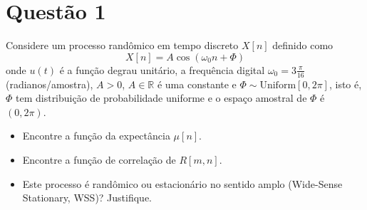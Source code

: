 \section{Questão 1}

Considere um processo randômico em tempo discreto $X[n]$ definido como
%
$$
    X[n] = A\cos(\omega_0 n + \Phi)
$$
%
onde $u(t)$ é a função degrau unitário,
a frequência digital $\omega_0 = 3\frac{\pi}{16}$ (radianos/amostra),
$A>0$, $A\in\mathbb{R}$ é uma constante e 
$\Phi \sim \text{Uniform}[0, 2\pi]$, isto é,
$\Phi$ tem distribuição de probabilidade uniforme e o espaço amostral de $\Phi$ é $(0, 2\pi)$.

\begin{itemize}
    \item [a)] Encontre a função da expectância $\mu[n]$.
    \item [b)] Encontre a função de correlação de $R[m,n]$.
    \item [c)] Este processo é randômico ou estacionário no sentido amplo (Wide-Sense Stationary, WSS)? Justifique.
\end{itemize}


